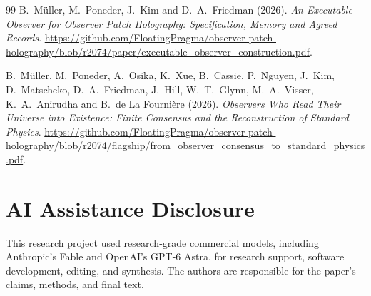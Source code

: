 \documentclass[11pt]{article}
\begin{document}
\begin{thebibliography}{99}
B.~M\"uller, M.~Poneder, J.~Kim and D.~A.~Friedman (2026). \emph{An Executable
Observer for Observer Patch Holography: Specification, Memory and Agreed
Records}.
\url{https://github.com/FloatingPragma/observer-patch-holography/blob/r2074/paper/executable_observer_construction.pdf}.

B.~M\"uller, M.~Poneder, A.~Osika, K.~Xue, B.~Cassie, P.~Nguyen, J.~Kim,
D.~Matscheko, D.~A.~Friedman, J.~Hill, W.~T.~Glynn, M.~A.~Visser,
K.~A.~Anirudha and B.~de La Fourni\`ere (2026). \emph{Observers Who Read Their
Universe into Existence: Finite Consensus and the Reconstruction of Standard
Physics}.
\url{https://github.com/FloatingPragma/observer-patch-holography/blob/r2074/flagship/from_observer_consensus_to_standard_physics.pdf}.

\end{thebibliography}

\section*{AI Assistance Disclosure}
This research project used research-grade commercial models, including
Anthropic's Fable and OpenAI's GPT-6 Astra, for research support, software
development, editing, and synthesis. The authors are responsible for the
paper's claims, methods, and final text.
\end{document}
